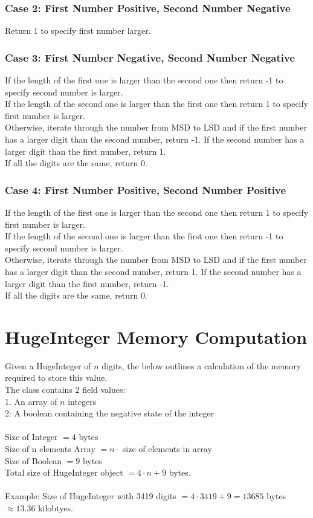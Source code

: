 \documentclass[12pt, letterpaper, titlepage, hidelinks]{article}
\begin{document}
		\subsubsection{Case 2: First Number Positive, Second Number Negative}
			Return 1 to specify first number larger.
		\subsubsection{Case 3: First Number Negative, Second Number Negative}
			If the length of the first one is larger than the second one then return -1 to specify second number is larger.\\
			If the length of the second one is larger than the first one then return 1 to specify first number is larger.\\
			Otherwise, iterate through the number from MSD to LSD and if the first number has a larger digit than the second number, return -1. If the second number has a larger digit than the first number, return 1.\\
			If all the digits are the same, return 0.\\

		\subsubsection{Case 4: First Number Positive, Second Number Positive}
			If the length of the first one is larger than the second one then return 1 to specify first number is larger.\\
			If the length of the second one is larger than the first one then return -1 to specify second number is larger.\\
			Otherwise, iterate through the number from MSD to LSD and if the first number has a larger digit than the second number, return 1. If the second number has a larger digit than the first number, return -1.\\
			If all the digits are the same, return 0.\\
\section{HugeInteger Memory Computation}
	Given a HugeInteger of $n$ digits, the below outlines a calculation of the memory required to store this value.\\
	The class contains 2 field values:\\
	1. An array of $n$ integers\\
	2: A boolean containing the negative state of the integer\\\\
	Size of Integer $= 4$ bytes\\
	Size of n elements Array $= n\cdot$ size of elements in array\\
	Size of Boolean $= 9$ bytes\\
	Total size of HugeInteger object $= 4\cdot n + 9$ bytes.\\\\
	Example: Size of HugeInteger with 3419 digits $= 4\cdot 3419 + 9 = 13685$ bytes $\approx 13.36$ kilobtyes.
\end{document}
